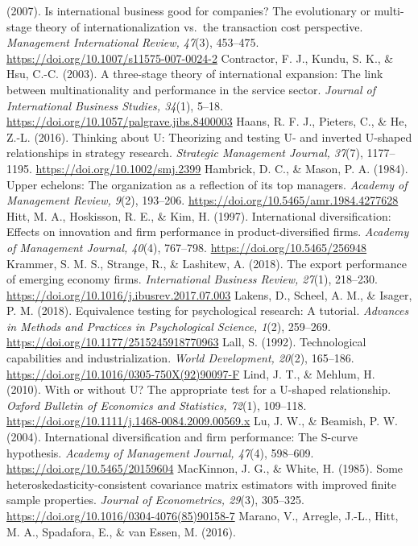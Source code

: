 \documentclass[
  12pt,a4paper]{article}
\begin{document}
(2007). Is international business good for companies? The evolutionary
or multi-stage theory of internationalization vs.~the transaction cost
perspective. \emph{Management International Review, 47}(3), 453--475.
\url{https://doi.org/10.1007/s11575-007-0024-2} Contractor, F. J.,
Kundu, S. K., \& Hsu, C.-C. (2003). A three-stage theory of
international expansion: The link between multinationality and
performance in the service sector. \emph{Journal of International
Business Studies, 34}(1), 5--18.
\url{https://doi.org/10.1057/palgrave.jibs.8400003} Haans, R. F. J.,
Pieters, C., \& He, Z.-L. (2016). Thinking about U: Theorizing and
testing U- and inverted U-shaped relationships in strategy research.
\emph{Strategic Management Journal, 37}(7), 1177--1195.
\url{https://doi.org/10.1002/smj.2399} Hambrick, D. C., \& Mason, P. A.
(1984). Upper echelons: The organization as a reflection of its top
managers. \emph{Academy of Management Review, 9}(2), 193--206.
\url{https://doi.org/10.5465/amr.1984.4277628} Hitt, M. A., Hoskisson,
R. E., \& Kim, H. (1997). International diversification: Effects on
innovation and firm performance in product-diversified firms.
\emph{Academy of Management Journal, 40}(4), 767--798.
\url{https://doi.org/10.5465/256948} Krammer, S. M. S., Strange, R., \&
Lashitew, A. (2018). The export performance of emerging economy firms.
\emph{International Business Review, 27}(1), 218--230.
\url{https://doi.org/10.1016/j.ibusrev.2017.07.003} Lakens, D., Scheel,
A. M., \& Isager, P. M. (2018). Equivalence testing for psychological
research: A tutorial. \emph{Advances in Methods and Practices in
Psychological Science, 1}(2), 259--269.
\url{https://doi.org/10.1177/2515245918770963} Lall, S. (1992).
Technological capabilities and industrialization. \emph{World
Development, 20}(2), 165--186.
\url{https://doi.org/10.1016/0305-750X(92)90097-F} Lind, J. T., \&
Mehlum, H. (2010). With or without U? The appropriate test for a
U-shaped relationship. \emph{Oxford Bulletin of Economics and
Statistics, 72}(1), 109--118.
\url{https://doi.org/10.1111/j.1468-0084.2009.00569.x} Lu, J. W., \&
Beamish, P. W. (2004). International diversification and firm
performance: The S-curve hypothesis. \emph{Academy of Management
Journal, 47}(4), 598--609. \url{https://doi.org/10.5465/20159604}
MacKinnon, J. G., \& White, H. (1985). Some
heteroskedasticity-consistent covariance matrix estimators with improved
finite sample properties. \emph{Journal of Econometrics, 29}(3),
305--325. \url{https://doi.org/10.1016/0304-4076(85)90158-7} Marano, V.,
Arregle, J.-L., Hitt, M. A., Spadafora, E., \& van Essen, M. (2016).
\end{document}
